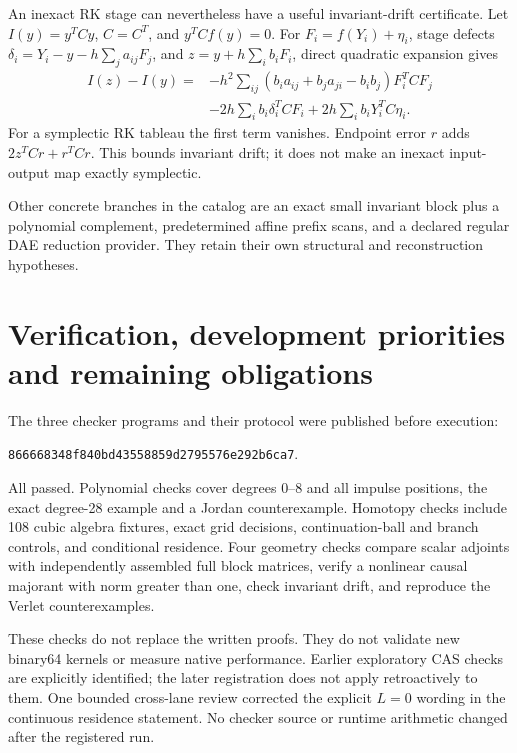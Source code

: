 \documentclass[aps,pra,reprint,onecolumn,11pt,notitlepage,nofootinbib]{revtex4-2}
\begin{document}
An inexact RK stage can nevertheless have a useful invariant-drift
certificate. Let $I(y)=y^TCy$, $C=C^T$, and $y^TCf(y)=0$.
For $F_i=f(Y_i)+\eta_i$, stage defects
$\delta_i=Y_i-y-h\sum_j a_{ij}F_j$, and $z=y+h\sum_i b_iF_i$,
direct quadratic expansion gives
\begin{align}
 I(z)-I(y)={}&-h^2\sum_{ij}(b_i a_{ij}+b_j a_{ji}-b_i b_j)F_i^TCF_j\nonumber\\
 &-2h\sum_i b_i\delta_i^TCF_i+2h\sum_i b_iY_i^TC\eta_i.
\end{align}
For a symplectic RK tableau the first term vanishes. Endpoint error $r$
adds $2z^TCr+r^TCr$. This bounds invariant drift; it does not make an
inexact input-output map exactly symplectic.

Other concrete branches in the catalog are an exact small invariant block
plus a polynomial complement, predetermined affine prefix scans, and a
declared regular DAE reduction provider. They retain their own structural
and reconstruction hypotheses.

\section{Verification, development priorities and remaining obligations}
The three checker programs and their protocol were published before execution:
\par\noindent\texttt{866668348f840bd43558859d2795576e292b6ca7}.
\par
All passed. Polynomial checks cover degrees 0--8 and all impulse positions,
the exact degree-28 example and a Jordan counterexample. Homotopy checks
include 108 cubic algebra fixtures, exact grid decisions, continuation-ball
and branch controls, and conditional residence. Four geometry checks compare
scalar adjoints with independently assembled full block matrices, verify a
nonlinear causal majorant with norm greater than one, check invariant drift,
and reproduce the Verlet counterexamples.

These checks do not replace the written proofs. They do not validate new
binary64 kernels or measure native performance. Earlier exploratory CAS
checks are explicitly identified; the later registration does not apply
retroactively to them. One bounded cross-lane review corrected the explicit
$L=0$ wording in the continuous residence statement. No checker source or
runtime arithmetic changed after the registered run.
\end{document}
